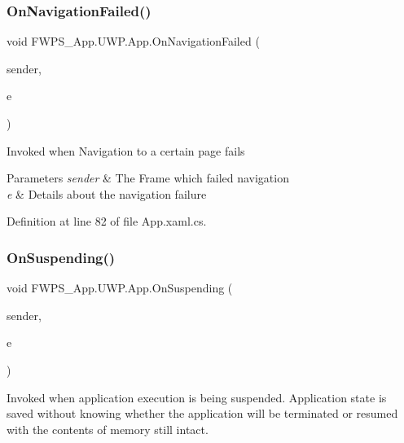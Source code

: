 \subsubsection{\texorpdfstring{On\+Navigation\+Failed()}{OnNavigationFailed()}}
{\footnotesize\ttfamily void F\+W\+P\+S\+\_\+\+App.\+U\+W\+P.\+App.\+On\+Navigation\+Failed (\begin{DoxyParamCaption}\item[{object}]{sender,  }\item[{Navigation\+Failed\+Event\+Args}]{e }\end{DoxyParamCaption})\hspace{0.3cm}{\ttfamily [private]}}



Invoked when Navigation to a certain page fails 


\begin{DoxyParams}{Parameters}
{\em sender} & The Frame which failed navigation\\
\hline
{\em e} & Details about the navigation failure\\
\hline
\end{DoxyParams}


Definition at line 82 of file App.\+xaml.\+cs.

\mbox{\label{class_f_w_p_s___app_1_1_u_w_p_1_1_app_a66a0e5da76b45b9b3c1e77b3a84fc423}} 
\subsubsection{\texorpdfstring{On\+Suspending()}{OnSuspending()}}
{\footnotesize\ttfamily void F\+W\+P\+S\+\_\+\+App.\+U\+W\+P.\+App.\+On\+Suspending (\begin{DoxyParamCaption}\item[{object}]{sender,  }\item[{Suspending\+Event\+Args}]{e }\end{DoxyParamCaption})\hspace{0.3cm}{\ttfamily [private]}}



Invoked when application execution is being suspended. Application state is saved without knowing whether the application will be terminated or resumed with the contents of memory still intact. 


